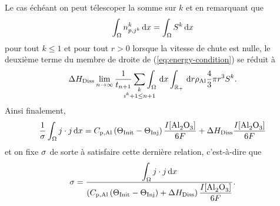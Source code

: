 Le cas échéant on peut télescoper la somme sur $k$ et en remarquant que
\begin{equation*}
  \int_\Omega n_{p,j^k}^k\,\mathrm dx = \int_\Omega S^k\,\mathrm dx
\end{equation*}
pour tout $k \leq 1$ et pour tout $r > 0$ lorsque la vitesse de chute
est nulle, le deuxième terme du membre de droite de
(\ref{eq:energy-condition}) se réduit à
\begin{equation*}
  {\aluminadissolutionenthalpy}\lim_{n\to\infty}\frac{1}{t_{n+1}}\sum_{\mathclap{\substack{k\\ i^k +
  1 \leq n + 1}}}\int_\Omega\intd{x}\int_\rplus\intd{r}\aluminadensity
  \frac{4}{3}\pi r^3 S^k.
\end{equation*}
Ainsi finalement,
\begin{equation*}
  \frac{1}{\sigma}\int_\Omega j\cdot j\intd{x}
  =\aluminahc\parent{\tinit-\tinj}\frac{I[\cee{Al2O3}]}{6F} + {\aluminadissolutionenthalpy}\frac{I[\cee{Al2O3}]}{6F}
\end{equation*}
et on fixe $\sigma$ de sorte à satisfaire cette dernière
relation, c'est-à-dire que
\begin{equation}\label{eq:conductivity-condition}
  \conductivity = \frac{\displaystyle\int_\Omega j\cdot j\intd{x}}{\parent{\aluminahc\parent{\tinit-\tinj} + {\aluminadissolutionenthalpy} }
    \displaystyle\frac{I[\cee{Al2O3}]}{6F}}.
\end{equation}

